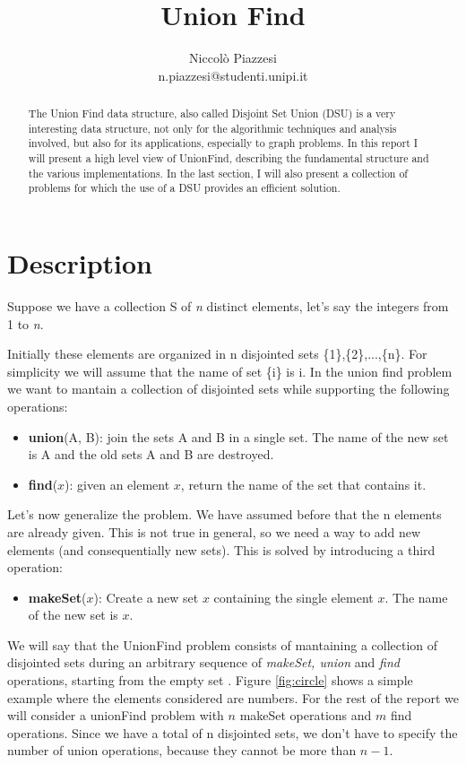 \documentclass{article}
\begin{document}
\title{ \textbf{Union Find}}
\author{Niccolò Piazzesi\\n.piazzesi@studenti.unipi.it}
\maketitle
\begin{abstract}
The Union Find data structure, also called Disjoint Set Union (DSU) is a very interesting data structure, not 
only  for the algorithmic techniques and  analysis involved, but also for its applications, especially to graph problems. In this
report I will present a high level view of UnionFind, describing the fundamental structure and the various implementations. In the last section, I will also present
a collection of problems for which the use of a DSU provides an efficient solution.
\end{abstract}
\section{Description}
Suppose we have a collection S of \emph{n} distinct elements, let's say the integers from 1 to \emph{n}. 

Initially these elements
are organized in n disjointed sets \{1\},\{2\},...,\{n\}. For simplicity we will assume that the name of set \{i\}
is i. In the union find problem we want to mantain a collection of disjointed sets while supporting the following operations:
\begin{itemize}
    \item \textbf{union}(A, B): join the sets A and B in a single set. The name of the new set is A and the old sets A and B are destroyed.
    \item \textbf{find}($x$): given an element $x$, return the name of the set that contains it.
\end{itemize}
Let's now generalize the problem. We have assumed before that the n elements are already given. This is not true in general, so we need a way to 
add new elements (and consequentially new sets). This is solved by introducing a third operation:
\begin{itemize}
    \item \textbf{makeSet}($x$): Create a new set {$x$} containing the single element $x$. The name of the new set is $x$.
\end{itemize}
We will say that the UnionFind problem consists of mantaining a collection of disjointed sets during 
an arbitrary sequence of \emph{makeSet, union} and \emph{find} operations, starting from the empty set \cite{demetrescu}. Figure \ref{fig:circle} shows a
simple example where the elements considered are numbers. For the rest of the report we will consider a unionFind problem with
$n$ makeSet operations and $m$ find operations. Since we have a total of n disjointed sets, we don't have to specify the number
of union operations, because they cannot be more than $n-1$.
\end{document}
